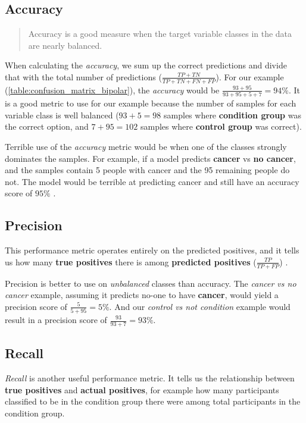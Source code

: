 \subsection{Accuracy}

\blockquote[\cite{ml_metrics}]{Accuracy is a good measure when the target variable classes in the data are nearly balanced.}

When calculating the \textit{accuracy}, we sum up the correct predictions and divide that with the total number of predictions 
($ \frac{TP + TN}{TP + TN + FN + FP} $).
For our example (\ref{table:confusion_matrix_bipolar}), the \textit{accuracy} would be 
$ \frac{93 + 95}{93 + 95 + 5 + 7} = 94\% $. 
It is a good metric to use for our example because the number of samples for each variable class is well balanced 
($ 93+5=98 $ samples where \textbf{condition group} was the correct option, and $ 7+95=102 $ samples where \textbf{control group} was correct).

Terrible use of the \textit{accuracy} metric would be when one of the classes strongly dominates the samples. 
For example, if a model predicts \textbf{cancer} vs \textbf{no cancer}, and the samples contain 5 people with cancer and 
the 95 remaining people do not. The model would be terrible at predicting cancer and still have an accuracy score of $ 95\% $ \cite{ml_metrics}.

\subsection{Precision} 

This performance metric operates entirely on the predicted positives, and it tells us how many \textbf{true positives} there is among 
\textbf{predicted positives} ($ \frac{TP}{TP + FP} $) \cite{ml_metrics}. 

Precision is better to use on \textit{unbalanced} classes than accuracy. The \textit{cancer vs no cancer} example, assuming it 
predicts no-one to have \textbf{cancer}, would yield a precision score of $ \frac{5}{5+95} = 5\% $. And our \textit{control vs not condition} example
would result in a precision score of $ \frac{93}{93+7} = 93\% $.

\subsection{Recall}

\textit{Recall} is another useful performance metric. It tells us the relationship between \textbf{true positives} and \textbf{actual positives},
for example how many participants classified to be in the condition group there were among total participants in the condition group.

